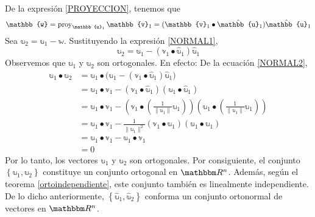 De la expresión \eqref{PROYECCION}, tenemos que
\begin{equation}
    \mathbb{w} = \proy_{\mathbb{u}_1} \mathbb{v}_1 = (\mathbb{v}_1 \bullet \hat{\mathbb{u}}_1) \hat{\mathbb{u}}_1 \label{NORMAL1}
\end{equation}\newpage\noindent
Sea $\mathbb{u}_2 = \mathbb{u}_1 - \mathbb{w}$. Sustituyendo la expresión \eqref{NORMAL1},
\begin{equation}
    \mathbb{u}_2 = \mathbb{u}_1 - (\mathbb{v}_1 \bullet \hat{\mathbb{u}}_1) \hat{\mathbb{u}}_1 \label{NORMAL2}
\end{equation}
Observemos que $\mathbb{u}_1$ y $\mathbb{u}_2$ son ortogonales. En efecto: De la ecuación \eqref{NORMAL2},
\begin{align*}
    \mathbb{u}_1 \bullet \mathbb{u}_2 & = \mathbb{u}_1 \bullet \big( \mathbb{u}_1 - (\mathbb{v}_1 \bullet \hat{\mathbb{u}}_1) \hat{\mathbb{u}}_1 \big) \\
    & = \mathbb{u}_1 \bullet \mathbb{v}_1 - (\mathbb{v}_1 \bullet \hat{\mathbb{u}}_1)(\mathbb{u}_1 \bullet \hat{\mathbb{u}}_1) \\
    & = \mathbb{u}_1 \bullet \mathbb{v}_1 - \left( \mathbb{v}_1 \bullet \left( \frac{1}{\| \mathbb{u}_1 \|} \mathbb{u}_1 \right) \right)\left( \mathbb{u}_1 \bullet \left( \frac{1}{\| \mathbb{u}_1 \|} \mathbb{u}_1 \right) \right) \\
    & = \mathbb{u}_1 \bullet \mathbb{v}_1 - \frac{1}{\| \mathbb{u}_1 \|^2} (\mathbb{v}_1 \bullet \mathbb{u}_1)(\mathbb{u}_1 \bullet \mathbb{u}_1) \\
    & = \mathbb{u}_1 \bullet \mathbb{v}_1 - \mathbb{u}_1 \bullet \mathbb{v}_1 \\
    & = 0
\end{align*}
Por lo tanto, los vectores \( \mathbb{u}_1 \) y \( \mathbb{u}_2 \) son ortogonales. Por consiguiente, el conjunto \( \left\{ \mathbb{u}_1, \mathbb{u}_2 \right\} \) constituye un conjunto ortogonal en \( \RR[n] \). Además, según el teorema \ref{ortoindependiente}, este conjunto también es linealmente independiente. De lo dicho anteriormente, $\left\{ \hat{\mathbb{u}}_1, \hat{\mathbb{u}}_2 \right\}$ conforma un conjunto ortonormal de vectores en $\RR[n]$.

